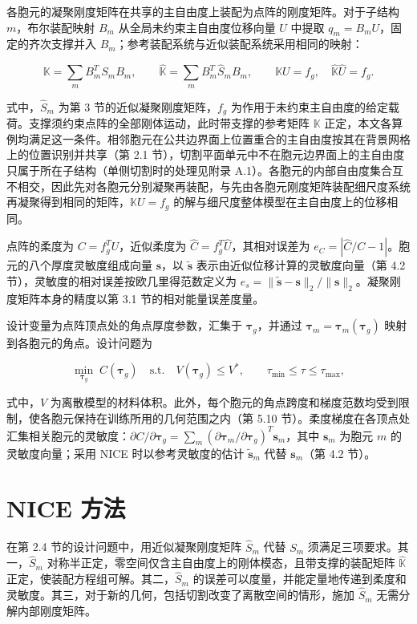 \documentclass[preprint,12pt,authoryear]{elsarticle}
\begin{document}
各胞元的凝聚刚度矩阵在共享的主自由度上装配为点阵的刚度矩阵。对于子结构 \(m\)，布尔装配映射 \(B_m\) 从全局未约束主自由度位移向量 \(U\) 中提取 \(q_m=B_mU\)，固定的齐次支撑并入 \(B_m\)；参考装配系统与近似装配系统采用相同的映射：

\[
\mathbb K=\sum_mB_m^TS_mB_m,\qquad
\widehat{\mathbb K}=\sum_mB_m^T\widehat S_mB_m,
\qquad
\mathbb K U=f_g,\quad\widehat{\mathbb K}\widehat U=f_g.
\tag{3}
\]

式中，\(\widehat S_m\) 为第 3 节的近似凝聚刚度矩阵，\(f_g\) 为作用于未约束主自由度的给定载荷。支撑须约束点阵的全部刚体运动，此时带支撑的参考矩阵 \(\mathbb K\) 正定，本文各算例均满足这一条件。相邻胞元在公共边界面上位置重合的主自由度按其在背景网格上的位置识别并共享（第 2.1 节），切割平面单元中不在胞元边界面上的主自由度只属于所在子结构（单侧切割时的处理见附录 A.1）。各胞元的内部自由度集合互不相交，因此先对各胞元分别凝聚再装配，与先由各胞元刚度矩阵装配细尺度系统再凝聚得到相同的矩阵，\(\mathbb KU=f_g\) 的解与细尺度整体模型在主自由度上的位移相同。

点阵的柔度为 \(C=f_g^TU\)，近似柔度为 \(\widehat C=f_g^T\widehat U\)，其相对误差为 \(e_C=|\widehat C/C-1|\)。胞元的八个厚度灵敏度组成向量 \(\boldsymbol s\)，以 \(\widetilde{\boldsymbol s}\) 表示由近似位移计算的灵敏度向量（第 4.2 节），灵敏度的相对误差按欧几里得范数定义为 \(e_s=\|\widetilde{\boldsymbol s}-\boldsymbol s\|_2/\|\boldsymbol s\|_2\)。凝聚刚度矩阵本身的精度以第 3.1 节的相对能量误差度量。

设计变量为点阵顶点处的角点厚度参数，汇集于 \(\boldsymbol\tau_g\)，并通过 \(\boldsymbol\tau_m=\boldsymbol\tau_m(\boldsymbol\tau_g)\) 映射到各胞元的角点。设计问题为

\[
\min_{\boldsymbol\tau_g}\;C(\boldsymbol\tau_g)\quad\text{s.t.}\quad V(\boldsymbol\tau_g)\le V^*,\qquad \tau_{\min}\le\tau\le\tau_{\max},
\]

式中，\(V\) 为离散模型的材料体积。此外，每个胞元的角点跨度和梯度范数均受到限制，使各胞元保持在训练所用的几何范围之内（第 5.10 节）。柔度梯度在各顶点处汇集相关胞元的灵敏度：\(\partial C/\partial\boldsymbol\tau_g=\sum_m(\partial\boldsymbol\tau_m/\partial\boldsymbol\tau_g)^T\boldsymbol s_m\)，其中 \(\boldsymbol s_m\) 为胞元 \(m\) 的灵敏度向量；采用 NICE 时以参考灵敏度的估计 \(\widetilde{\boldsymbol s}_m\) 代替 \(\boldsymbol s_m\)（第 4.2 节）。

\section{NICE 方法}

在第 2.4 节的设计问题中，用近似凝聚刚度矩阵 \(\widehat S_m\) 代替 \(S_m\) 须满足三项要求。其一，\(\widehat S_m\) 对称半正定，零空间仅含主自由度上的刚体模态，且带支撑的装配矩阵 \(\widehat{\mathbb K}\) 正定，使装配方程组可解。其二，\(\widehat S_m\) 的误差可以度量，并能定量地传递到柔度和灵敏度。其三，对于新的几何，包括切割改变了离散空间的情形，施加 \(\widehat S_m\) 无需分解内部刚度矩阵。
\end{document}

